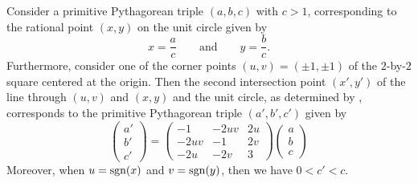 \begin{theorem}\label{theorem:pythagorean-descent}
  Consider a primitive Pythagorean triple $(a,b,c)$ with $c>1$, corresponding to the rational point $(x,y)$ on the unit circle given by
  \begin{equation*}
    x=\frac{a}{c}\qquad\text{and}\qquad y=\frac{b}{c}.
  \end{equation*}
  Furthermore, consider one of the corner points $(u,v)=(\pm 1,\pm 1)$ of the $2$-by-$2$ square centered at the origin. Then the second intersection point $(x',y')$ of the line through $(u,v)$ and $(x,y)$ and the unit circle, as determined by , corresponds to the primitive Pythagorean triple $(a',b',c')$ given by
  \begin{equation*}
    \begin{pmatrix}
      a' \\
      b' \\
      c'
    \end{pmatrix}
    =
    \begin{pmatrix}
      -1 & -2uv & 2u \\
      -2uv & -1 & 2v \\
      -2u & -2v & 3
    \end{pmatrix}
    \begin{pmatrix}
      a \\
      b \\
      c
    \end{pmatrix}
  \end{equation*}
  Moreover, when $u =\operatorname{sgn}(x)$ and $v =\operatorname{sgn}(y)$, then we have $0<c'<c$.
\end{theorem}

